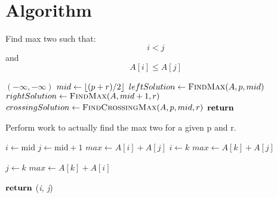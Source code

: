 \documentclass{article}
\DeclarePairedDelimiter\floor{\lfloor}{\rfloor}
\begin{document}
 

    \section{Algorithm}

    \begin{algorithm}[H]             
        \caption{Find max two such that: \[i < j\] and \[A[i] \leq A[j]\]}
        \label{alg:algorithm-label}
        \begin{algorithmic}[1]
                    \Return $ (-\infty, -\infty) $ 
                \Else
                    \State $ mid \gets \floor{(p + r)/2} $
                    \State $ leftSolution \gets \Call{FindMax}{A, p, mid} $
                    \State $ rightSolution \gets \Call{FindMax}{A, mid + 1, r} $
                    \State $ crossingSolution \gets \Call{FindCrossingMax}{A, p, mid, r} $
                    \State $ \Return $  $ $
                \EndIf
            \EndFunction
        \end{algorithmic}        
    \end{algorithm}    

    \begin{algorithm}[H]               
        \caption{Perform work to actually find the max two for a given p and r.}
        \label{alg:algorithm-label}
        \begin{algorithmic}[1]
                \State $ i \gets \text{mid} $
                \State $ j \gets \text{mid} + 1 $            
                \State $ max \gets  A[i] + A[j]$    
                        \State $ i \gets k $
                        \State $ max \gets A[k] + A[j] $
                    \EndIf
                \EndFor

                        \State $ j \gets k $
                        \State $ max \gets A[k] + A[i] $
                    \EndIf
                \EndFor

                \State $ \Return $ (\textit{i, j})
            \EndFunction
        \end{algorithmic}        
    \end{algorithm}    
        
\end{document}
